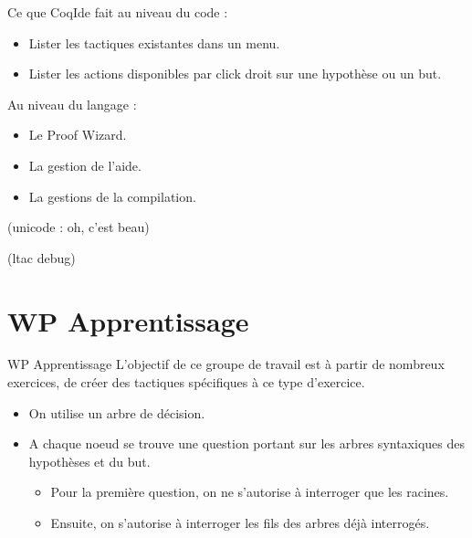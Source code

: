\documentclass[slidetop]{beamer}
\begin{document}
\begin{frame}

Ce que CoqIde fait au niveau du code :

\begin{itemize}
    \item Lister les tactiques existantes dans un menu.
    \item Lister les actions disponibles par click droit sur une hypothèse ou un but.
\end{itemize}



\end{frame}


\begin{frame}

Au niveau du langage :

\begin{itemize}
    \item Le Proof Wizard.
    \item La gestion de l'aide.
    \item La gestions de la compilation.
\end{itemize}


\end{frame}



\begin{frame}
(unicode : oh, c'est beau)
\end{frame}

\begin{frame}
(ltac debug)
\end{frame}

\section{WP Apprentissage}
\begin{frame}
WP Apprentissage
L'objectif de ce groupe de travail est à partir de nombreux exercices, de créer des tactiques spécifiques à ce type d'exercice.
\end{frame}
\begin{frame}

\begin{itemize}
    \item On utilise un arbre de décision. 
    \item A chaque noeud se trouve une question portant sur les arbres syntaxiques des hypothèses et du but. 
\begin{itemize}
    \item Pour la première question, on ne s'autorise à interroger que les racines.
    \item Ensuite, on s'autorise à interroger les fils des arbres déjà interrogés.
\end{itemize}
\end{itemize}

\end{frame}
\end{document}
